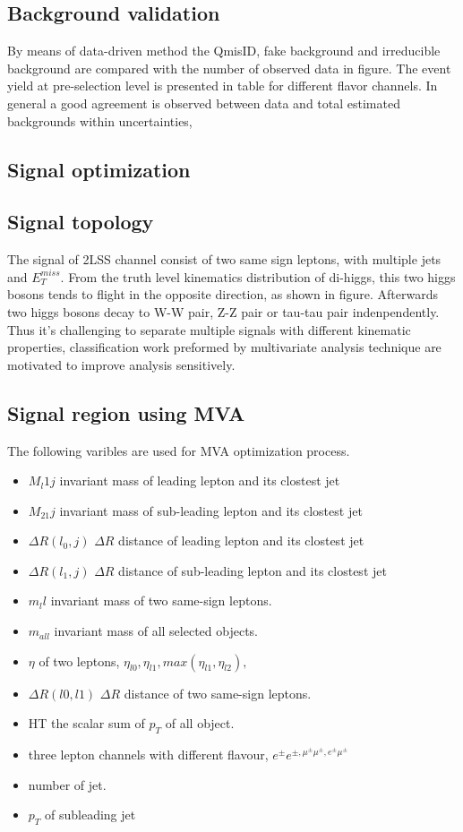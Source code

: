 \subsection{Background validation}
By means of data-driven method the QmisID, fake background and irreducible background are compared with the number of observed data in figure. The event yield at pre-selection level is presented in table for different flavor channels. In general a good agreement is observed between data and total estimated backgrounds within uncertainties, 

\subsection{Signal optimization}
\subsection{Signal topology}

The signal of 2LSS channel consist of two same sign leptons, with multiple jets and $E_T^{miss}$. From the truth level kinematics distribution of di-higgs, this two higgs bosons tends to flight in the opposite direction, as shown in figure. Afterwards two higgs bosons decay to W-W pair, Z-Z pair or tau-tau pair indenpendently. Thus it's challenging to separate multiple signals with different kinematic properties, classification work preformed by multivariate analysis technique are motivated to improve analysis sensitively.\\


\subsection{Signal region using MVA}


The following varibles are used for MVA optimization process.\\
\begin{itemize}
\item $M_l1j$ invariant mass of leading lepton and its clostest jet
\item $M_21j$ invariant mass of sub-leading lepton and its clostest jet
\item $\Delta R(l_0,j)$ $\Delta R$ distance of leading lepton and its clostest jet
\item $\Delta R(l_1,j)$ $\Delta R$ distance of sub-leading lepton and its clostest jet
\item $m_ll$ invariant mass of two same-sign leptons.
\item $m_{all}$ invariant mass of all selected objects.
\item $\eta$ of two leptons, $\eta_{l0},\eta_{l1},max(\eta_{l1},\eta_{l2}),$ 
\item $\Delta R(l0,l1)$ $\Delta R$ distance of two same-sign leptons.
\item HT the scalar sum of $p_T$ of all object. 
\item three lepton channels with different flavour, $e^{\pm}e^{\pm,\mu^{\pm}\mu^{\pm},e^{\pm}\mu^{\pm}}$
\item number of jet.
\item $p_T$ of subleading jet
\end{itemize}

